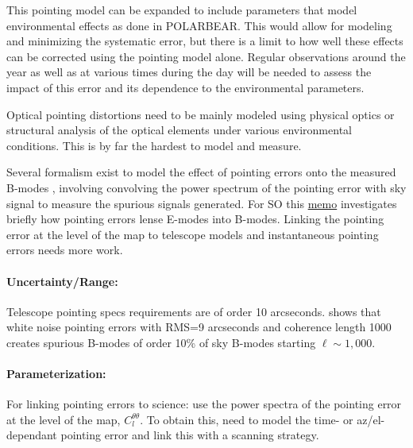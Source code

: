 This pointing model can be expanded to include parameters that model environmental effects as done in POLARBEAR. This would allow for modeling and minimizing the systematic error, but there is a limit to how well these effects can be corrected using the pointing model alone. Regular observations around the year as well as at various times during the day will be needed to assess the impact of this error and its dependence to the environmental parameters.

Optical pointing distortions need to be mainly modeled using physical optics or structural analysis of the optical elements under various environmental conditions. This is by far the hardest to model and measure.

Several formalism exist to model the effect of pointing errors onto the measured B-modes \cite{hu03, Shimon_2008}, involving convolving the power spectrum of the pointing error with sky signal to measure the spurious signals generated. For SO this \href{http://simonsobservatory.wdfiles.com/local--files/calandsys-telecon/eb_leakage_from_pointing_error.pdf?ukey=61f26ef33e8439a4e7096ab52c54c523066a4e35}{memo} investigates briefly how pointing errors lense E-modes into B-modes. Linking the pointing error at the level of the map to telescope models and instantaneous pointing errors needs more work.

\paragraph{Uncertainty/Range:}
Telescope pointing specs requirements are of order 10 arcseconds.
\cite{didier_memo17} shows that white noise pointing errors with RMS=9 arcseconds and coherence length 1000 creates spurious B-modes of order 10\% of sky B-modes starting $\ell \sim 1,000$.

\paragraph{Parameterization:}
For linking pointing errors to science: use the power spectra of the pointing error at the level of the map, $C_l^{\theta \theta}$.
To obtain this, need to model the time- or az/el-dependant pointing error and link this with a scanning strategy.
